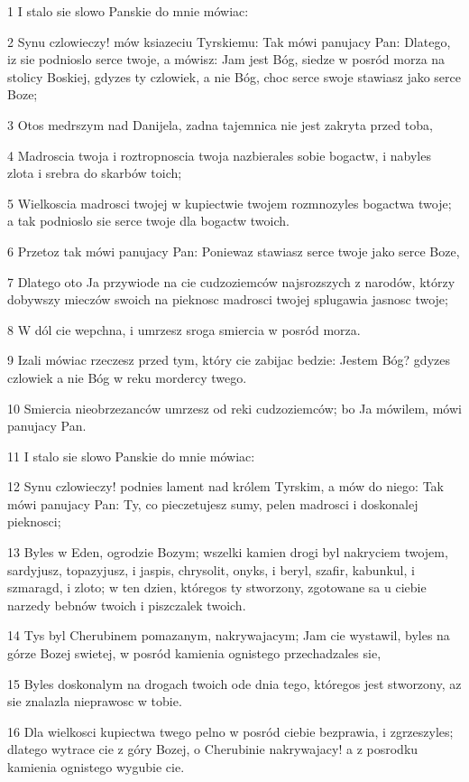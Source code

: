 \par 1 I stalo sie slowo Panskie do mnie mówiac:
\par 2 Synu czlowieczy! mów ksiazeciu Tyrskiemu: Tak mówi panujacy Pan: Dlatego, iz sie podnioslo serce twoje, a mówisz: Jam jest Bóg, siedze w posród morza na stolicy Boskiej, gdyzes ty czlowiek, a nie Bóg, choc serce swoje stawiasz jako serce Boze;
\par 3 Otos medrszym nad Danijela, zadna tajemnica nie jest zakryta przed toba,
\par 4 Madroscia twoja i roztropnoscia twoja nazbierales sobie bogactw, i nabyles zlota i srebra do skarbów toich;
\par 5 Wielkoscia madrosci twojej w kupiectwie twojem rozmnozyles bogactwa twoje; a tak podnioslo sie serce twoje dla bogactw twoich.
\par 6 Przetoz tak mówi panujacy Pan: Poniewaz stawiasz serce twoje jako serce Boze,
\par 7 Dlatego oto Ja przywiode na cie cudzoziemców najsrozszych z narodów, którzy dobywszy mieczów swoich na pieknosc madrosci twojej splugawia jasnosc twoje;
\par 8 W dól cie wepchna, i umrzesz sroga smiercia w posród morza.
\par 9 Izali mówiac rzeczesz przed tym, który cie zabijac bedzie: Jestem Bóg? gdyzes czlowiek a nie Bóg w reku mordercy twego.
\par 10 Smiercia nieobrzezanców umrzesz od reki cudzoziemców; bo Ja mówilem, mówi panujacy Pan.
\par 11 I stalo sie slowo Panskie do mnie mówiac:
\par 12 Synu czlowieczy! podnies lament nad królem Tyrskim, a mów do niego: Tak mówi panujacy Pan: Ty, co pieczetujesz sumy, pelen madrosci i doskonalej pieknosci;
\par 13 Byles w Eden, ogrodzie Bozym; wszelki kamien drogi byl nakryciem twojem, sardyjusz, topazyjusz, i jaspis, chrysolit, onyks, i beryl, szafir, kabunkul, i szmaragd, i zloto; w ten dzien, któregos ty stworzony, zgotowane sa u ciebie narzedy bebnów twoich i piszczalek twoich.
\par 14 Tys byl Cherubinem pomazanym, nakrywajacym; Jam cie wystawil, byles na górze Bozej swietej, w posród kamienia ognistego przechadzales sie,
\par 15 Byles doskonalym na drogach twoich ode dnia tego, któregos jest stworzony, az sie znalazla nieprawosc w tobie.
\par 16 Dla wielkosci kupiectwa twego pelno w posród ciebie bezprawia, i zgrzeszyles; dlatego wytrace cie z góry Bozej, o Cherubinie nakrywajacy! a z posrodku kamienia ognistego wygubie cie.
